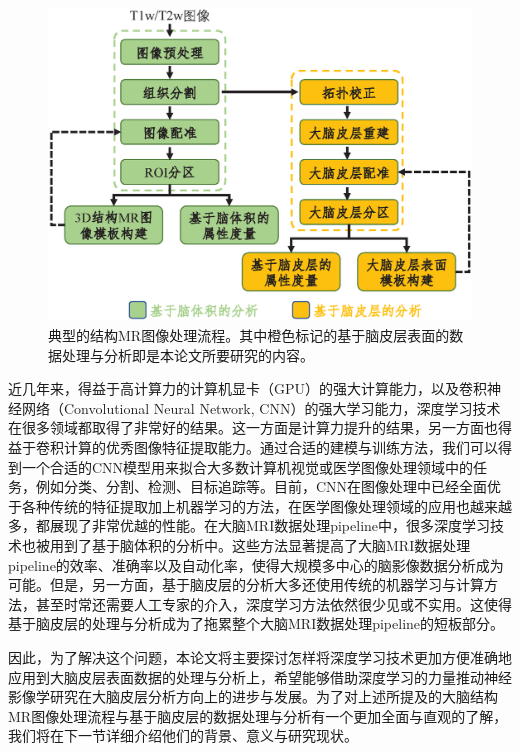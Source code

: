 \begin{figure}[t]
    \centering
    \includegraphics[width=.8\linewidth]{figure/flowchart_of_MRI_process_pipeline.eps}
    \caption{\label{fig:flowchart_of_MRI_process_pipeline}典型的结构MR图像处理流程。其中橙色标记的基于脑皮层表面的数据处理与分析即是本论文所要研究的内容。}
\end{figure}

近几年来，得益于高计算力的计算机显卡（GPU）的强大计算能力，以及卷积神经网络（Convolutional Neural Network, CNN）的强大学习能力，深度学习技术\cite{goodfellow2016deep}在很多领域都取得了非常好的结果。这一方面是计算力提升的结果，另一方面也得益于卷积计算的优秀图像特征提取能力。通过合适的建模与训练方法，我们可以得到一个合适的CNN模型用来拟合大多数计算机视觉或医学图像处理领域中的任务，例如分类、分割、检测、目标追踪等。目前，CNN在图像处理中已经全面优于各种传统的特征提取加上机器学习的方法，在医学图像处理领域的应用也越来越多，都展现了非常优越的性能\cite{shen2017deep,litjens2017survey}。在大脑MRI数据处理pipeline中，很多深度学习技术也被用到了基于脑体积的分析中\cite{li2019computational}。这些方法显著提高了大脑MRI数据处理pipeline的效率、准确率以及自动化率，使得大规模多中心的脑影像数据分析成为可能。但是，另一方面，基于脑皮层的分析大多还使用传统的机器学习与计算方法，甚至时常还需要人工专家的介入，深度学习方法依然很少见或不实用。这使得基于脑皮层的处理与分析成为了拖累整个大脑MRI数据处理pipeline的短板部分。

因此，为了解决这个问题，本论文将主要探讨怎样将深度学习技术更加方便准确地应用到大脑皮层表面数据的处理与分析上，希望能够借助深度学习的力量推动神经影像学研究在大脑皮层分析方向上的进步与发展。为了对上述所提及的大脑结构MR图像处理流程与基于脑皮层的数据处理与分析有一个更加全面与直观的了解，我们将在下一节详细介绍他们的背景、意义与研究现状。

